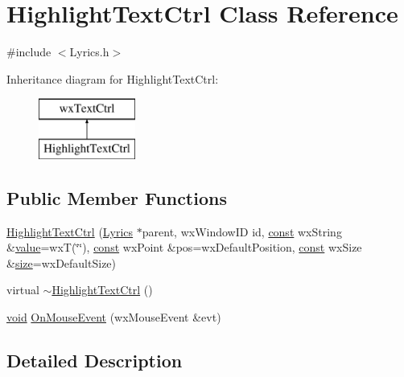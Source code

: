 \hypertarget{class_highlight_text_ctrl}{}\section{Highlight\+Text\+Ctrl Class Reference}
\label{class_highlight_text_ctrl}


{\ttfamily \#include $<$Lyrics.\+h$>$}

Inheritance diagram for Highlight\+Text\+Ctrl\+:\begin{figure}[H]
\begin{center}
\leavevmode
\includegraphics[height=2.000000cm]{class_highlight_text_ctrl}
\end{center}
\end{figure}
\subsection*{Public Member Functions}
\begin{DoxyCompactItemize}
\item 
\hyperlink{class_highlight_text_ctrl_a752c52ff4032145a0a9c22ef5b66f3ed}{Highlight\+Text\+Ctrl} (\hyperlink{class_lyrics}{Lyrics} $\ast$parent, wx\+Window\+ID id, \hyperlink{getopt1_8c_a2c212835823e3c54a8ab6d95c652660e}{const} wx\+String \&\hyperlink{lib_2expat_8h_a4a30a13b813682e68c5b689b45c65971}{value}=wxT(\char`\"{}\char`\"{}), \hyperlink{getopt1_8c_a2c212835823e3c54a8ab6d95c652660e}{const} wx\+Point \&pos=wx\+Default\+Position, \hyperlink{getopt1_8c_a2c212835823e3c54a8ab6d95c652660e}{const} wx\+Size \&\hyperlink{group__lavu__mem_ga854352f53b148adc24983a58a1866d66}{size}=wx\+Default\+Size)
\item 
virtual \hyperlink{class_highlight_text_ctrl_aafd851e041ffd932065956d9eca04a75}{$\sim$\+Highlight\+Text\+Ctrl} ()
\item 
\hyperlink{sound_8c_ae35f5844602719cf66324f4de2a658b3}{void} \hyperlink{class_highlight_text_ctrl_a0e63b8ca90943641a67db28a395f15c4}{On\+Mouse\+Event} (wx\+Mouse\+Event \&evt)
\end{DoxyCompactItemize}


\subsection{Detailed Description}


